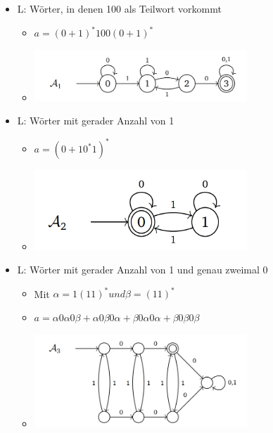 \documentclass[11pt,a4paper]{article}
\begin{document}
\begin{itemize}

\item L: Wörter, in denen 100 als Teilwort vorkommt
	\begin{itemize}
	\item $a = (0+1)^*100(0+1)^*$
	\item[]
		\begin{center}
		\includegraphics[width=8cm]{auto1}
		\end{center}	
	\end{itemize}

\item L: Wörter mit gerader Anzahl von 1
	\begin{itemize}
	\item $a=(0+10^*1)^*$
	\item[]
		\begin{center}
		\includegraphics[width=8cm]{auto2}
		\end{center}	
	\end{itemize}
	
\item L: Wörter mit gerader Anzahl von 1 und genau zweimal 0
	\begin{itemize}
	\item Mit $\alpha = 1(11)^* und \beta=(11)^*$
	\item $a = \alpha0\alpha0\beta + \alpha0\beta0\alpha + \beta0\alpha0\alpha + \beta0\beta0\beta$
	\item[]
		\begin{center}
		\includegraphics[width=8cm]{auto3}
		\end{center}	
	\end{itemize}
	

\end{itemize}
\end{document}
